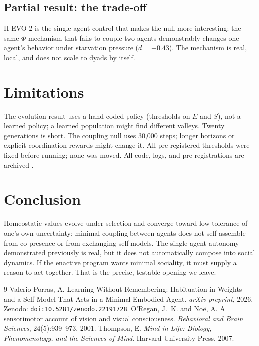 \documentclass[11pt,a4paper]{article}
\begin{document}
\subsection{Partial result: the trade-off}

H-EVO-2 is the single-agent control that makes the null more interesting: the same $\Phi$ mechanism that fails to couple two agents demonstrably changes one agent's behavior under starvation pressure ($d=-0.43$). The mechanism is real, local, and does not scale to dyads by itself.

\section{Limitations}

The evolution result uses a hand-coded policy (thresholds on $E$ and $S$), not a learned policy; a learned population might find different valleys. Twenty generations is short. The coupling null uses 30,000 steps; longer horizons or explicit coordination rewards might change it. All pre-registered thresholds were fixed before running; none was moved. All code, logs, and pre-registrations are archived \cite{v012}.

\section{Conclusion}

Homeostatic values evolve under selection and converge toward low tolerance of one's own uncertainty; minimal coupling between agents does not self-assemble from co-presence or from exchanging self-models. The single-agent autonomy demonstrated previously is real, but it does not automatically compose into social dynamics. If the enactive program wants minimal sociality, it must supply a reason to act together. That is the precise, testable opening we leave.

\begin{thebibliography}{9}
 Valerio Porras, A. Learning Without Remembering: Habituation in Weights and a Self-Model That Acts in a Minimal Embodied Agent. \textit{arXiv preprint}, 2026. Zenodo: \texttt{doi:10.5281/zenodo.22191728}.
 O'Regan, J.~K. and No\"e, A. A sensorimotor account of vision and visual consciousness. \textit{Behavioral and Brain Sciences}, 24(5):939--973, 2001.
 Thompson, E. \textit{Mind in Life: Biology, Phenomenology, and the Sciences of Mind}. Harvard University Press, 2007.
\end{thebibliography}
\end{document}
